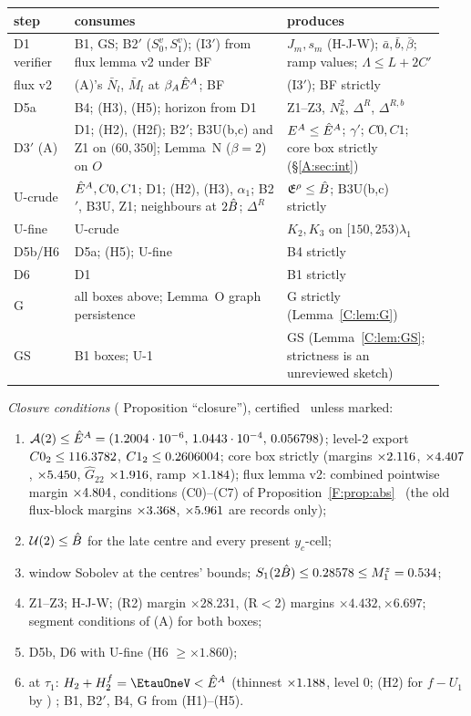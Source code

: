 \documentclass[11pt]{article}
\begin{document}
\begin{center}\small\begin{tabular}{@{}p{0.12\linewidth}p{0.47\linewidth}p{0.35\linewidth}@{}}\toprule
step & consumes & produces\\\midrule
D1 verifier & B1, GS; B2$'$ ($S^v_0,S^v_1$); (I3$'$) from flux lemma v2 under BF & $J_m,s_m$ (H-J-W); $\bar a,\bar b,\bar\beta$; ramp values; $\Lambda\le L+2C'$\\
flux v2 & (A)'s $\bar N_l$, $\bar M_l$ at $\beta_A\hat E^A$; BF & (I3$'$); BF strictly\\
D5a & B4; (H3), (H5); horizon from D1 & Z1--Z3, $N_k^2$, $\Delta^R$, $\Delta^{R,b}$\\
D3$'$ (A) & D1; (H2), (H2f); B2$'$; B3U(b,c) and Z1 on $(60,350]$; Lemma~N ($\beta=2$) on $O$ & $E^A\le\hat E^A$; $\gamma'$; $C0,C1$; core box strictly (\S\ref{A:sec:int})\\
U-crude & $\hat E^A,C0,C1$; D1; (H2), (H3), $\alpha_1$; B2$'$, B3U, Z1; neighbours at $2\hat B$; $\Delta^R$ & $\mathfrak E^\rho\le\hat B$; B3U(b,c) strictly\\
U-fine & U-crude & $K_2,K_3$ on $[150,253)\lambda_1$\\
D5b/H6 & D5a; (H5); U-fine & B4 strictly\\
D6 & D1 & B1 strictly\\
G & all boxes above; Lemma~O graph persistence & G strictly (Lemma~\ref{C:lem:G})\\
GS & B1 boxes; U-1 & GS (Lemma~\ref{C:lem:GS}; strictness is an unreviewed sketch)\\\bottomrule\end{tabular}\end{center}
\noindent\emph{Closure conditions} ( Proposition ``closure''), certified \tC\ unless marked:
\begin{enumerate}[label=(K\arabic*),leftmargin=2.6em]
\item $\mathcal A(2)\le\hat E^A=(1.2004\cdot10^{-6},\,1.0443\cdot10^{-4},\,0.056798)$; level-2 export $C0_2\le116.3782$, $C1_2\le0.2606004$; core box strictly (margins $\times2.116$, $\times4.407$, $\times5.450$, $\hat G_{22}$ $\times1.916$, ramp $\times1.184$); flux lemma v2: combined pointwise margin $\times4.804$, conditions (C0)--(C7) of Proposition~\ref{F:prop:abs} \tC\ (the old flux-block margins $\times3.368$, $\times5.961$ are records only);
\item $\mathcal U(2)\le\hat B$ for the late centre and every present $y_c$-cell;
\item window Sobolev at the centres' bounds; $S_1(2\hat B)\le0.28578\le M_1^z=0.534$;
\item Z1--Z3; H-J-W; (R2) margin $\times28.231$, (R$<$2) margins $\times4.432,\times6.697$; segment conditions of (A) for both boxes;
\item D5b, D6 with U-fine (H6 $\ge\times1.860$);
\item at $\tau_1$: $H_2+H^f_2=\EtauOneV<\Eh$ (thinnest $\times1.188$, level 0; (H2) for $f-U_1$ by ) \tB; B1, B2$'$, B4, G from (H1)--(H5).
\end{enumerate}
\end{document}
